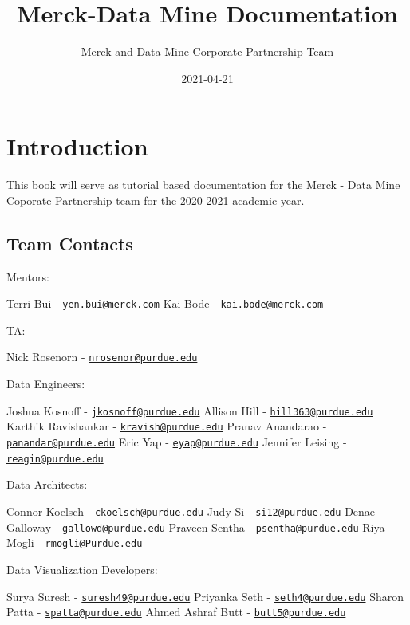 \documentclass[]{book}
\title{Merck-Data Mine Documentation}
\author{Merck and Data Mine Corporate Partnership Team}
\date{2021-04-21}
\begin{document}
\maketitle

{
\setcounter{tocdepth}{1}
\tableofcontents
}
\hypertarget{introduction}{%
\chapter{Introduction}\label{introduction}}

This book will serve as tutorial based documentation for the Merck - Data Mine Coporate Partnership team for the 2020-2021 academic year.

\hypertarget{team-contacts}{%
\section{Team Contacts}\label{team-contacts}}

Mentors:

Terri Bui - \href{mailto:yen.bui@merck.com}{\nolinkurl{yen.bui@merck.com}}
Kai Bode - \href{mailto:kai.bode@merck.com}{\nolinkurl{kai.bode@merck.com}}

TA:

Nick Rosenorn - \href{mailto:nrosenor@purdue.edu}{\nolinkurl{nrosenor@purdue.edu}}

Data Engineers:

Joshua Kosnoff - \href{mailto:jkosnoff@purdue.edu}{\nolinkurl{jkosnoff@purdue.edu}}
Allison Hill - \href{mailto:hill363@purdue.edu}{\nolinkurl{hill363@purdue.edu}}
Karthik Ravishankar - \href{mailto:kravish@purdue.edu}{\nolinkurl{kravish@purdue.edu}}
Pranav Anandarao - \href{mailto:panandar@purdue.edu}{\nolinkurl{panandar@purdue.edu}}
Eric Yap - \href{mailto:eyap@purdue.edu}{\nolinkurl{eyap@purdue.edu}}
Jennifer Leising - \href{mailto:reagin@purdue.edu}{\nolinkurl{reagin@purdue.edu}}

Data Architects:

Connor Koelsch - \href{mailto:ckoelsch@purdue.edu}{\nolinkurl{ckoelsch@purdue.edu}}
Judy Si - \href{mailto:si12@purdue.edu}{\nolinkurl{si12@purdue.edu}}
Denae Galloway - \href{mailto:gallowd@purdue.edu}{\nolinkurl{gallowd@purdue.edu}}
Praveen Sentha - \href{mailto:psentha@purdue.edu}{\nolinkurl{psentha@purdue.edu}}
Riya Mogli - \href{mailto:rmogli@Purdue.edu}{\nolinkurl{rmogli@Purdue.edu}}

Data Visualization Developers:

Surya Suresh - \href{mailto:suresh49@purdue.edu}{\nolinkurl{suresh49@purdue.edu}}
Priyanka Seth - \href{mailto:seth4@purdue.edu}{\nolinkurl{seth4@purdue.edu}}
Sharon Patta - \href{mailto:spatta@purdue.edu}{\nolinkurl{spatta@purdue.edu}}
Ahmed Ashraf Butt - \href{mailto:butt5@purdue.edu}{\nolinkurl{butt5@purdue.edu}}
\end{document}
